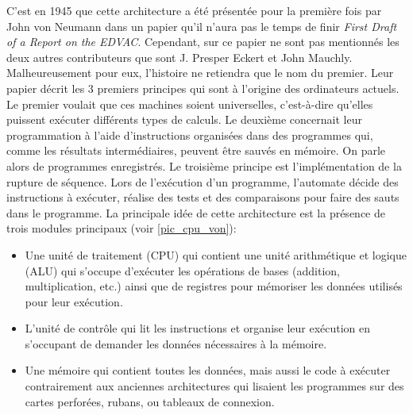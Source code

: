         C'est en 1945 que cette architecture a été présentée pour la première fois par John von Neumann dans un papier qu'il n'aura pas le temps de finir \textit{First Draft of a Report on the EDVAC}. Cependant, sur ce papier ne sont pas mentionnés les deux autres contributeurs que sont J. Presper Eckert et John Mauchly. Malheureusement pour eux, l'histoire ne retiendra que le nom du premier. Leur papier décrit les 3 premiers principes qui sont à l'origine des ordinateurs actuels. Le premier voulait que ces machines soient universelles, c'est-à-dire qu'elles puissent exécuter différents types de calculs. Le deuxième concernait leur programmation à l'aide d'instructions organisées dans des programmes qui, comme les résultats intermédiaires, peuvent être sauvés en mémoire. On parle alors de programmes enregistrés. Le troisième principe est l'implémentation de la rupture de séquence. Lors de l'exécution d'un programme, l'automate décide des instructions à exécuter, réalise des tests et des comparaisons pour faire des sauts dans le programme. La principale idée de cette architecture est la présence de trois modules principaux (voir \autoref{pic_cpu_von}):
         \begin{itemize}
            \item Une unité de traitement (CPU) qui contient une unité arithmétique et logique (ALU) qui s'occupe d'exécuter les opérations de bases (addition, multiplication, etc.) ainsi que de registres pour mémoriser les données utilisés pour leur exécution.
            \item L'unité de contrôle qui lit les instructions et organise leur exécution en s'occupant de demander les données nécessaires à la mémoire.
            \item Une mémoire qui contient toutes les données, mais aussi le code à exécuter contrairement aux anciennes architectures qui lisaient les programmes sur des cartes perforées, rubans, ou tableaux de connexion.
         \end{itemize}
          
        
        
